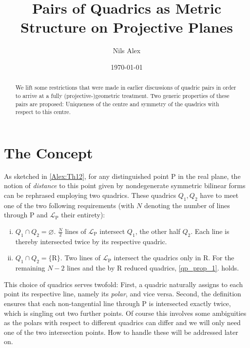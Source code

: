\documentclass[12pt,english,paper=a4,DIV=12,headings=small,numbers=noenddot,parskip=half]{scrartcl}
\theoremstyle{definition}
\begin{document}
\title{Pairs of Quadrics as Metric Structure on Projective Planes}
\author{Nils Alex}
\date{\today}

\maketitle

\begin{abstract}
We lift some restrictions that were made in earlier discussions of quadric pairs in order to arrive at a fully (projective-)geometric treatment. Two generic properties of these pairs are proposed: Uniqueness of the centre and symmetry of the quadrics with respect to this centre.
\end{abstract}

\section{The Concept}

As sketched in \ref{Alex:Th12}, for any distinguished point $\mathrm{P}$ in the real plane, the notion of \emph{distance} to this point given by nondegenerate symmetric bilinear forms can be rephrased employing two quadrics. These quadrics $Q_1, Q_2$ have to meet one of the two following requirements (with $N$ denoting the number of lines through $\mathrm{P}$ and $\mathscr{L}_\mathrm{P}$ their entirety):
\begin{enumerate}[i.]
\item{$Q_1 \cap Q_2 = \varnothing$. $\frac{N}{2}$ lines of $\mathscr{L}_\mathrm{P}$ intersect $Q_1$, the other half $Q_2$. Each line is thereby intersected twice by its respective quadric.\label{qp_prop_1}} 
\item{$Q_1 \cap Q_2 = \{ \mathrm{R} \}$. Two lines of $\mathscr{L}_\mathrm{P}$ intersect the quadrics only in $\mathrm{R}$. For the remaining $N-2$ lines and the by $\mathrm{R}$ reduced quadrics, \ref{qp_prop_1}. holds.}
\end{enumerate}

This choice of quadrics serves twofold: First, a quadric naturally assigns to each point its respective line, namely its \emph{polar}, and vice versa. Second, the definition ensures that each non-tangential line through $\mathrm{P}$ is intersected exactly twice, which is singling out two further points. Of course this involves some ambiguities as the polars with respect to different quadrics can differ and we will only need one of the two intersection points. How to handle these will be addressed later on.
\end{document}
